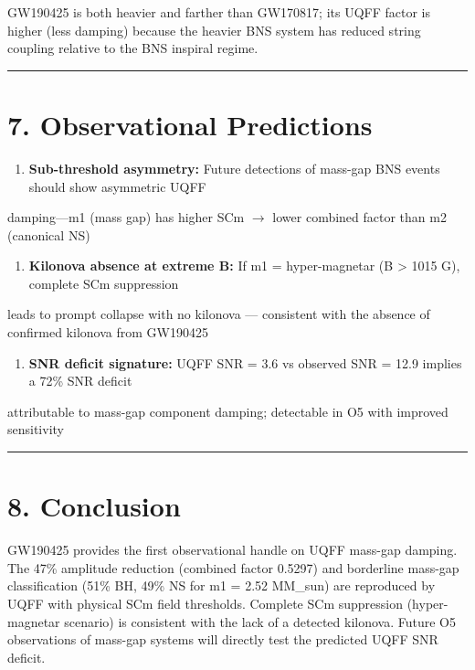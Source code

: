 \documentclass[11pt]{article}
\begin{document}
GW190425 is both heavier and farther than GW170817; its UQFF factor is higher (less damping) because the heavier BNS system has reduced string coupling relative to the BNS inspiral regime.

\noindent\rule{\textwidth}{0.4pt}

\section*{7. Observational Predictions}

\begin{enumerate}
  \item \textbf{Sub-threshold asymmetry:} Future detections of mass-gap BNS events should show asymmetric UQFF
\end{enumerate}

damping---m1 (mass gap) has higher SCm $\to$ lower combined factor than m2 (canonical NS)

\begin{enumerate}
  \item \textbf{Kilonova absence at extreme B:} If m1 = hyper-magnetar (B > 1015 G), complete SCm suppression
\end{enumerate}

leads to prompt collapse with no kilonova --- consistent with the absence of confirmed kilonova from GW190425

\begin{enumerate}
  \item \textbf{SNR deficit signature:} UQFF SNR = 3.6 vs observed SNR = 12.9 implies a 72\% SNR deficit
\end{enumerate}

attributable to mass-gap component damping; detectable in O5 with improved sensitivity

\noindent\rule{\textwidth}{0.4pt}

\section*{8. Conclusion}

GW190425 provides the first observational handle on UQFF mass-gap damping. The 47\% amplitude reduction (combined factor 0.5297) and borderline mass-gap classification (51\% BH, 49\% NS for m1 = 2.52 MM\_sun) are reproduced by UQFF with physical SCm field thresholds. Complete SCm suppression (hyper-magnetar scenario) is consistent with the lack of a detected kilonova. Future O5 observations of mass-gap systems will directly test the predicted UQFF SNR deficit.
\end{document}
